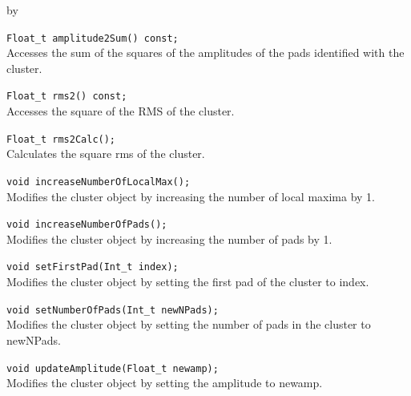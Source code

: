 \documentclass[twoside]{article}
\newcommand{\entrylabel}[1]{\mbox{\textbf{{#1}}}\hfil}%
\newenvironment{entry}
{\begin{list}{}%
    {\renewcommand{\makelabel}{\entrylabel}%
     \setlength{\labelwidth}{90pt}%
     \setlength{\leftmargin}{\labelwidth}
     \advance\leftmargin by \labelsep%
      }%
    }%
  {\end{list}}
\newcommand{\Entrylabel}[1]%
{\raisebox{0pt}[1ex][0pt]{\makebox[\labelwidth][l]%
    {\parbox[t]{\labelwidth}{\hspace{0pt}\textbf{{#1}}}}}}
\newenvironment{Entry}%
{\renewcommand{\entrylabel}{\Entrylabel}\begin{entry}}%
  {\end{entry}}
\begin{document}
\begin{Entry}
    \verb+Float_t amplitude2Sum() const;+\\
    Accesses the sum of the squares of the amplitudes of the pads
    identified with the cluster.

    \verb+Float_t rms2() const;+\\
    Accesses the square of the RMS of the cluster.

    \verb+Float_t rms2Calc();+\\
    Calculates the square rms of the cluster.

    \verb+void increaseNumberOfLocalMax();+\\
    Modifies the cluster object by increasing the number
    of local maxima by 1.

    \verb+void increaseNumberOfPads();+\\
    Modifies the cluster object by increasing the number
    of pads by 1.    

    \verb+void setFirstPad(Int_t index);+\\
    Modifies the cluster object by setting the first pad
    of the cluster to index.

    \verb+void setNumberOfPads(Int_t newNPads);+\\
    Modifies the cluster object by setting the number
    of pads in the cluster to newNPads.

    \verb+void updateAmplitude(Float_t newamp);+\\
    Modifies the cluster object by setting the amplitude to
    newamp.
\end{Entry}
\clearpage
\end{document}
